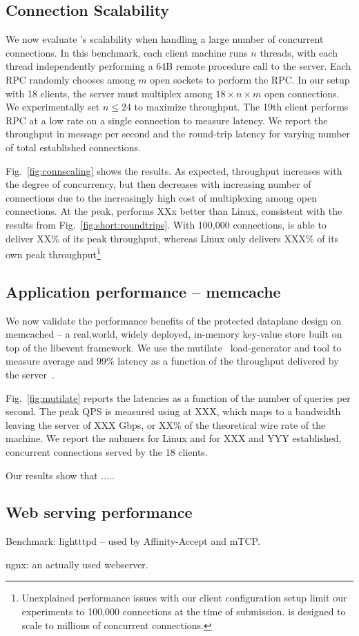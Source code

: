 \subsection{Connection Scalability}


\label{sec:eval:scale}

We now evaluate \ix's scalability when handling a large number of
concurrent connections. In this benchmark, each client machine runs
$n$ threads, with each thread independently performing a 64B remote
procedure call to the server.  Each RPC randomly chooses among $m$
open sockets to perform the RPC.  In our setup with 18 clients, the
server must multiplex among $18 \times n \times m$ open connections.
We experimentally set $n \leq 24$ to maximize throughput.  The 19th
client performs RPC at a low rate on a single connection to measure
latency.  We report the throughput in message per second and the
round-trip latency for varying number of total established connections.

Fig.~\ref{fig:connscaling} shows the results.  As expected, throughput
increases with the degree of concurrency, but then decreases with
increasing number of connections due to the increasingly high cost of
multiplexing among open connections.  At the peak, \ix performs XXx
better than Linux, consistent with the results from
Fig.~\ref{fig:short:roundtrips}.  With 100,000 connections, \ix is
able to deliver XX\% of its peak throughput, whereas Linux only
delivers XXX\% of its own peak throughput\footnote{Unexplained
  performance issues with our client configuration setup limit our
  experiments to 100,000 connections at the time of submission. \ix is
  designed to scale to millions of concurrent connections.}


\subsection{Application performance -- memcache}
\label{sec:eval:memcache}



We now validate the performance benefits of the protected dataplane
design on memcached -- a real,world, widely deployed, in-memory
key-value store built on top of the libevent framework.  We use the
mutilate~\cite{url:mutilate} load-generator and tool to measure
average and 99\% latency as a function of the throughput delivered by
the server~\cite{Leverich:RHSU:2014}.

Fig.~\ref{fig:mutilate} reports the latencies as a function of the
number of queries per second.  The peak QPS is measured using \ix at
XXX, which maps to a bandwidth leaving the server of XXX Gbps, or XX\%
of the theoretical wire rate of the machine.  We report the nubmers
for Linux and \ix for XXX and YYY established, concurrent
connections served by the 18 clients.

Our results show that .....

\subsection{Web serving performance}


\todo Benchmark: lightttpd -- used by Affinity-Accept and mTCP.  

\todo ngnx: an actually used webserver.



%
